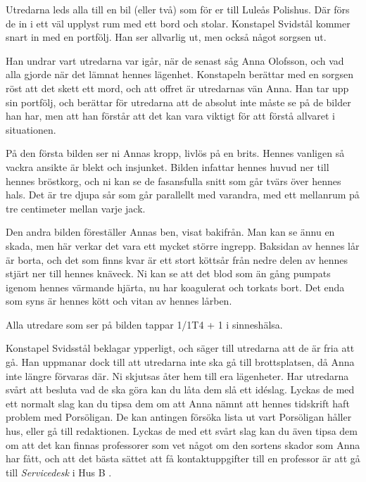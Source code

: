 Utredarna leds alla till en bil (eller två) som för er till Luleås Polishus. Där förs de in i ett väl upplyst rum med ett bord och stolar. Konstapel Svidstål kommer snart in med en portfölj. Han ser allvarlig ut, men också något sorgsen ut.

Han undrar vart utredarna var igår, när de senast såg Anna Olofsson, och vad alla gjorde när det lämnat hennes lägenhet. Konstapeln berättar med en sorgsen röst att det skett ett mord, och att offret är utredarnas vän Anna. Han tar upp sin portfölj, och berättar för utredarna att de absolut inte måste se på de bilder han har, men att han förstår att det kan vara viktigt för att förstå allvaret i situationen.

\begin{displayquote}
	På den första bilden ser ni Annas kropp, livlös på en brits. Hennes vanligen så vackra ansikte är blekt och insjunket. Bilden infattar hennes huvud ner till hennes bröstkorg, och ni kan se de fasansfulla snitt som går tvärs över hennes hals. Det är tre djupa sår som går parallellt med varandra, med ett mellanrum på tre centimeter mellan varje jack.

	Den andra bilden föreställer Annas ben, visat bakifrån. Man kan se ännu en skada, men här verkar det vara ett mycket större ingrepp. Baksidan av hennes lår är borta, och det som finns kvar är ett stort köttsår från nedre delen av hennes stjärt ner till hennes knäveck. Ni kan se att det blod som än gång pumpats igenom hennes värmande hjärta, nu har koagulerat och torkats bort. Det enda som syns är hennes kött och vitan av hennes lårben.
\end{displayquote}
%
Alla utredare som ser på bilden tappar 1/1T4 + 1 i sinneshälsa. 

Konstapel Svidsstål beklagar ypperligt, och säger till utredarna att de är fria att gå. Han uppmanar dock till att utredarna inte ska gå till brottsplatsen, då Anna inte längre förvaras där. Ni skjutsas åter hem till era lägenheter. Har utredarna svårt att besluta vad de ska göra kan du låta dem slå ett idéslag. Lyckas de med ett normalt slag kan du tipsa dem om att Anna nämnt att hennes tidskrift haft problem med Porsöligan. De kan antingen försöka lista ut vart Porsöligan håller hus, eller gå till redaktionen. Lyckas de med ett svårt slag kan du även tipsa dem om att det kan finnas professorer som vet något om den sortens skador som Anna har fått, och att det bästa sättet att få kontaktuppgifter till en professor är att gå till \textit{Servicedesk} i Hus B \sectiondescribe{\ref{loc:Servicedesk}}.